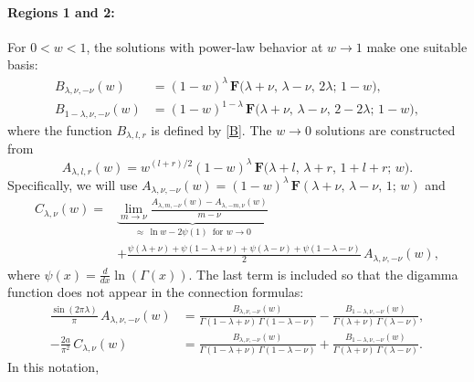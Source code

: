 \documentclass[11pt]{article}
\newcommand{\hgfs}{\mathbf{F}}
\begin{document}
\paragraph{Regions 1 and 2:} For $0<w<1$, the solutions with power-law behavior at $w\to 1$ make one suitable basis:
\begin{equation}
\begin{aligned}
B_{\lambda,\nu,-\nu}(w) &=(1-w)^{\lambda}\,
\hgfs\bigl(\lambda+\nu,\,\lambda-\nu,\,2\lambda;\,1-w\bigr),
\\[2pt]
B_{1-\lambda,\nu,-\nu}(w) &=(1-w)^{1-\lambda}\,
\hgfs\bigl(\lambda+\nu,\,\lambda-\nu,\,2-2\lambda;\,1-w\bigr),
\end{aligned}
\end{equation}
where the function $B_{\lambda,l,r}$ is defined by \eqref{B}. The $w\to 0$ solutions are constructed from
\begin{equation} \label{Af}
A_{\lambda,l,r}(w)=w^{(l+r)/2}(1-w)^{\lambda}\,
\hgfs\bigl(\lambda+l,\,\lambda+r,\,1+l+r;\,w\bigr).
\end{equation}
Specifically, we will use $A_{\lambda,\nu,-\nu}(w) =(1-w)^{\lambda}\, \hgfs(\lambda+\nu,\,\lambda-\nu,\,1;\,w)$ and
\begin{equation}
\begin{aligned} \label{Cf}
C_{\lambda,\nu}(w)={}&
\underbrace{\lim_{m\to\nu}\frac{A_{\lambda,m,-\nu}(w)-A_{\lambda,-m,\nu}(w)}
{m-\nu}}_{\approx\,\ln w-2\psi(1)\, \text{ for } w\to 0}\\[2pt]
&+\frac{\psi(\lambda+\nu)+\psi(1-\lambda+\nu)
+\psi(\lambda-\nu)+\psi(1-\lambda-\nu)}{2}\,A_{\lambda,\nu,-\nu}(w),
\end{aligned}
\end{equation}
where $\psi(x)=\frac{d}{dx}\ln(\Gamma(x))$. The last term is included so that the digamma function does not appear in the connection formulas:
\begin{equation}
\begin{aligned} \label{ABtrans12}
\frac{\sin(2\pi\lambda)}{\pi}\,A_{\lambda,\nu,-\nu}(w)
&=\frac{B_{\lambda,\nu,-\nu}(w)}{\Gamma(1-\lambda+\nu)\,\Gamma(1-\lambda-\nu)}
-\frac{B_{1-\lambda,\nu,-\nu}(w)}{\Gamma(\lambda+\nu)\,\Gamma(\lambda-\nu)},
\\[3pt]
-\frac{2a}{\pi^2}\,C_{\lambda,\nu}(w)
&=\frac{B_{\lambda,\nu,-\nu}(w)}{\Gamma(1-\lambda+\nu)\,\Gamma(1-\lambda-\nu)}
+\frac{B_{1-\lambda,\nu,-\nu}(w)}{\Gamma(\lambda+\nu)\,\Gamma(\lambda-\nu)}.
\end{aligned}
\end{equation}
In this notation,
\end{document}
